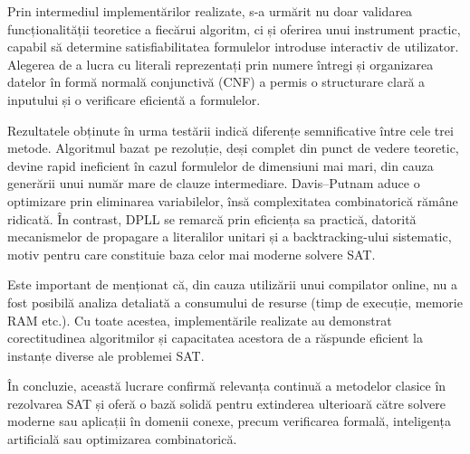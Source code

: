 \documentclass[12pt,a4paper]{article}
\begin{document}
Prin intermediul implementărilor realizate, s-a urmărit nu doar validarea funcționalității teoretice a fiecărui algoritm, ci și oferirea unui instrument practic, capabil să determine satisfiabilitatea formulelor introduse interactiv de utilizator. Alegerea de a lucra cu literali reprezentați prin numere întregi și organizarea datelor în formă normală conjunctivă (CNF) a permis o structurare clară a inputului și o verificare eficientă a formulelor.

Rezultatele obținute în urma testării indică diferențe semnificative între cele trei metode. Algoritmul bazat pe rezoluție, deși complet din punct de vedere teoretic, devine rapid ineficient în cazul formulelor de dimensiuni mai mari, din cauza generării unui număr mare de clauze intermediare. Davis–Putnam aduce o optimizare prin eliminarea variabilelor, însă complexitatea combinatorică rămâne ridicată. În contrast, DPLL se remarcă prin eficiența sa practică, datorită mecanismelor de propagare a literalilor unitari și a backtracking-ului sistematic, motiv pentru care constituie baza celor mai moderne solvere SAT.

Este important de menționat că, din cauza utilizării unui compilator online, nu a fost posibilă analiza detaliată a consumului de resurse (timp de execuție, memorie RAM etc.). Cu toate acestea, implementările realizate au demonstrat corectitudinea algoritmilor și capacitatea acestora de a răspunde eficient la instanțe diverse ale problemei SAT.

În concluzie, această lucrare confirmă relevanța continuă a metodelor clasice în rezolvarea SAT și oferă o bază solidă pentru extinderea ulterioară către solvere moderne sau aplicații în domenii conexe, precum verificarea formală, inteligența artificială sau optimizarea combinatorică.




\newpage
\end{document}
